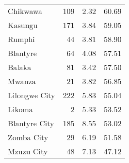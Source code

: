 \begin{tabular}{lrrr}
Chikwawa       &     109 &           2.32 &               60.69 \\
Kasungu        &     171 &           3.84 &               59.05 \\
Rumphi         &      44 &           3.81 &               58.90 \\
Blantyre       &      64 &           4.08 &               57.51 \\
Balaka         &      81 &           3.42 &               57.50 \\
Mwanza         &      21 &           3.82 &               56.85 \\
Lilongwe City  &     222 &           5.83 &               55.04 \\
Likoma         &       2 &           5.33 &               53.52 \\
Blantyre City  &     185 &           8.55 &               53.02 \\
Zomba City     &      29 &           6.19 &               51.58 \\
Mzuzu City     &      48 &           7.13 &               47.12 \\
\bottomrule
\end{tabular}
